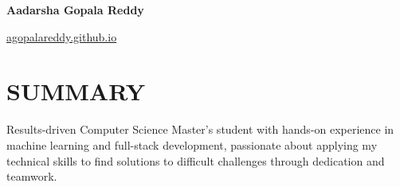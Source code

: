 \documentclass[10pt, letterpaper]{article}
\begin{document}
\begin{header}
    \begin{minipage}[t]{0.65\textwidth}
        \fontsize{20pt}{20pt}\selectfont \textbf{Aadarsha Gopala Reddy}\\
        \normalsize
        \mbox{}%
        \kern {}%
        \AND%
        \kern {}%
        \mbox{}%
    \end{minipage}
    \hfill %
    \begin{minipage}[t]{0.15\textwidth}
        \raggedleft %
        \href{https://agopalareddy.github.io}{agopalareddy.github.io}
    \end{minipage}
    \hfill %
    \begin{minipage}[t]{0.11\textwidth}
        \raggedleft %
    \end{minipage}
\end{header}

\vspace{\headerSpacing} %

\section{SUMMARY}

\vspace{\entrySpacing} %
\begin{samepage} %
    \begin{onecolentry}
        Results-driven Computer Science Master's student with hands-on experience in machine learning and full-stack development, passionate about applying my technical skills to find solutions to difficult challenges through dedication and teamwork.
    \end{onecolentry}
\end{samepage}
\end{document}

